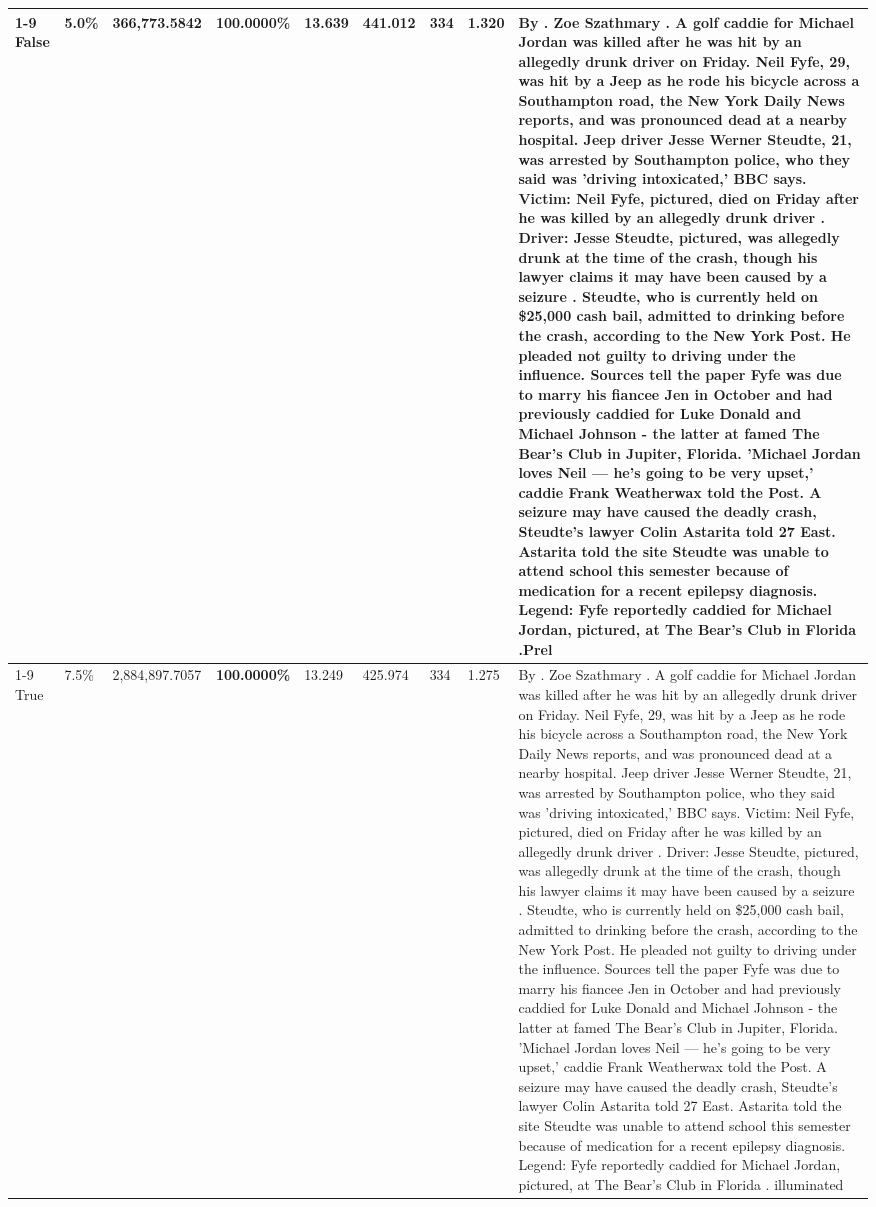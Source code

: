 \begin{table}[H]
\begin{tabular}{lllrlllll}
\cline{1-9}
False & 5.0\% & 366,773.5842 & \bfseries \color{red} 100.0000\% & 13.639 & 441.012 & 334 & 1.320 & By . Zoe Szathmary . A golf caddie for Michael Jordan was killed after he was hit by an allegedly drunk driver on Friday. Neil Fyfe, 29, was hit by a Jeep as he rode his bicycle across a Southampton road, the New York Daily News reports, and was pronounced dead at a nearby hospital. Jeep driver Jesse Werner Steudte, 21, was arrested by Southampton police, who they said was 'driving intoxicated,' BBC says. Victim: Neil Fyfe, pictured, died on Friday after he was killed by an allegedly drunk driver . Driver: Jesse Steudte, pictured, was allegedly drunk at the time of the crash, though his lawyer claims it may have been caused by a seizure . Steudte, who is currently held on \$25,000 cash bail, admitted to drinking before the crash, according to the New York Post. He pleaded not guilty to driving under the influence. Sources tell the paper Fyfe was due to marry his fiancee Jen in October and had previously caddied for Luke Donald and Michael Johnson - the latter at famed The Bear's Club in Jupiter, Florida. 'Michael Jordan loves Neil — he’s going to be very upset,' caddie Frank Weatherwax told the Post. A seizure may have caused the deadly crash, Steudte's lawyer Colin Astarita told 27 East. Astarita told the site Steudte was unable to attend school this semester because of medication for a recent epilepsy diagnosis. Legend: Fyfe reportedly caddied for Michael Jordan, pictured, at The Bear's Club in Florida .Prel \\
\cline{1-9}
True & 7.5\% & 2,884,897.7057 & \bfseries \color{red} 100.0000\% & 13.249 & 425.974 & 334 & 1.275 & By . Zoe Szathmary . A golf caddie for Michael Jordan was killed after he was hit by an allegedly drunk driver on Friday. Neil Fyfe, 29, was hit by a Jeep as he rode his bicycle across a Southampton road, the New York Daily News reports, and was pronounced dead at a nearby hospital. Jeep driver Jesse Werner Steudte, 21, was arrested by Southampton police, who they said was 'driving intoxicated,' BBC says. Victim: Neil Fyfe, pictured, died on Friday after he was killed by an allegedly drunk driver . Driver: Jesse Steudte, pictured, was allegedly drunk at the time of the crash, though his lawyer claims it may have been caused by a seizure . Steudte, who is currently held on \$25,000 cash bail, admitted to drinking before the crash, according to the New York Post. He pleaded not guilty to driving under the influence. Sources tell the paper Fyfe was due to marry his fiancee Jen in October and had previously caddied for Luke Donald and Michael Johnson - the latter at famed The Bear's Club in Jupiter, Florida. 'Michael Jordan loves Neil — he’s going to be very upset,' caddie Frank Weatherwax told the Post. A seizure may have caused the deadly crash, Steudte's lawyer Colin Astarita told 27 East. Astarita told the site Steudte was unable to attend school this semester because of medication for a recent epilepsy diagnosis. Legend: Fyfe reportedly caddied for Michael Jordan, pictured, at The Bear's Club in Florida . illuminated \\

\end{tabular}
\end{table}
